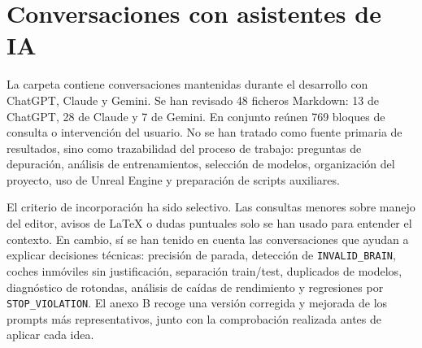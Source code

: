 \clearpage
\section{Conversaciones con asistentes de IA}

La carpeta  contiene conversaciones mantenidas durante el desarrollo con ChatGPT, Claude y Gemini. Se han revisado 48 ficheros Markdown: 13 de ChatGPT, 28 de Claude y 7 de Gemini. En conjunto reúnen 769 bloques de consulta o intervención del usuario. No se han tratado como fuente primaria de resultados, sino como trazabilidad del proceso de trabajo: preguntas de depuración, análisis de entrenamientos, selección de modelos, organización del proyecto, uso de Unreal Engine y preparación de scripts auxiliares.

El criterio de incorporación ha sido selectivo. Las consultas menores sobre manejo del editor, avisos de LaTeX o dudas puntuales solo se han usado para entender el contexto. En cambio, sí se han tenido en cuenta las conversaciones que ayudan a explicar decisiones técnicas: precisión de parada, detección de \texttt{INVALID\_BRAIN}, coches inmóviles sin justificación, separación train/test, duplicados de modelos, diagnóstico de rotondas, análisis de caídas de rendimiento y regresiones por \texttt{STOP\_VIOLATION}. El anexo B recoge una versión corregida y mejorada de los prompts más representativos, junto con la comprobación realizada antes de aplicar cada idea.
